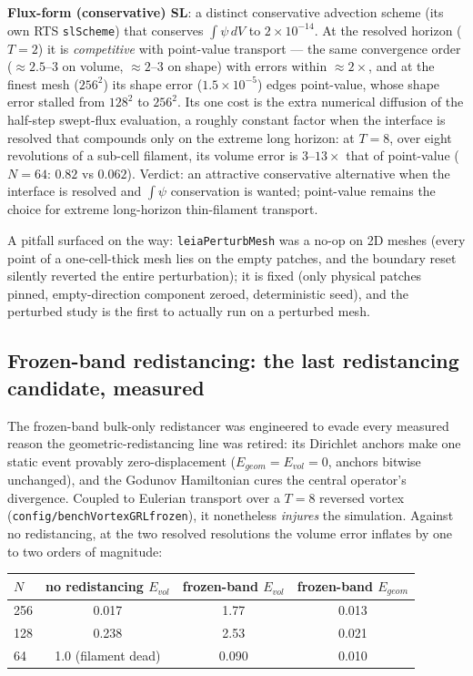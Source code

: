 \documentclass[preprint,3p,11pt]{elsarticle}
\begin{document}
\textbf{Flux-form (conservative) SL}: a distinct conservative advection scheme
(its own RTS \texttt{slScheme}) that conserves $\int\psi\,dV$ to
$2\times10^{-14}$. At the resolved horizon ($T = 2$) it is \emph{competitive}
with point-value transport --- the same convergence order (${\approx}2.5$--$3$
on volume, ${\approx}2$--$3$ on shape) with errors within ${\approx}2\times$,
and at the finest mesh ($256^2$) its shape error ($1.5\times10^{-5}$) edges
point-value, whose shape error stalled from $128^2$ to $256^2$. Its one cost is
the extra numerical diffusion of the half-step swept-flux evaluation, a roughly
constant factor when the interface is resolved that compounds only on the
extreme long horizon: at $T = 8$, over eight revolutions of a sub-cell filament,
its volume error is $3$--$13\times$ that of point-value ($N{=}64$: $0.82$ vs
$0.062$). Verdict: an attractive conservative alternative when the interface is
resolved and $\int\psi$ conservation is wanted; point-value remains the choice
for extreme long-horizon thin-filament transport.

A pitfall surfaced on the way: \texttt{leiaPerturbMesh} was a no-op on 2D
meshes (every point of a one-cell-thick mesh lies on the empty patches, and
the boundary reset silently reverted the entire perturbation); it is fixed
(only physical patches pinned, empty-direction component zeroed, deterministic
seed), and the perturbed study is the first to actually run on a perturbed
mesh.

\subsection{Frozen-band redistancing: the last redistancing candidate, measured}
\label{sec:frozen}
The frozen-band bulk-only redistancer was engineered to evade every measured
reason the geometric-redistancing line was retired: its Dirichlet anchors make
one static event provably zero-displacement ($E_{geom} = E_{vol} = 0$, anchors
bitwise unchanged), and the Godunov Hamiltonian cures the central operator's
divergence. Coupled to Eulerian transport over a $T = 8$ reversed vortex
(\texttt{config/benchVortexGRLfrozen}), it nonetheless \emph{injures} the
simulation. Against no redistancing, at the two resolved resolutions the volume
error inflates by one to two orders of magnitude:

\begin{center}
\begin{tabular}{lccc}
\toprule
$N$ & no redistancing $E_{vol}$ & frozen-band $E_{vol}$ & frozen-band $E_{geom}$ \\
\midrule
256 & 0.017 & 1.77 & 0.013 \\
128 & 0.238 & 2.53 & 0.021 \\
 64 & 1.0 (filament dead) & 0.090 & 0.010 \\
\bottomrule
\end{tabular}
\end{center}
\end{document}
